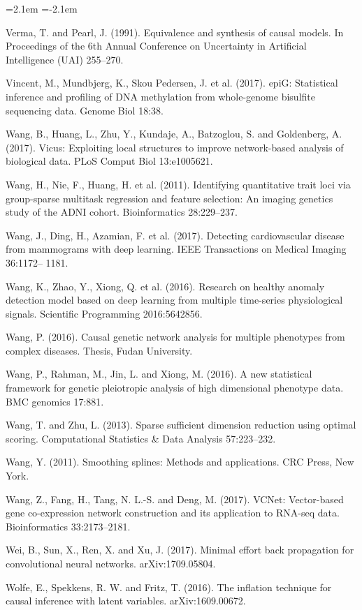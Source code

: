 \begin{list}{}{\leftmargin=2.1em  
  \itemindent=-2.1em \parsep=0pt \itemsep=2pt \topsep=0pt}
\item Verma, T. and Pearl, J. (1991). Equivalence and synthesis of causal models. In Proceedings of the 6th Annual Conference on Uncertainty in Artificial Intelligence (UAI) 255--270.
\item Vincent, M., Mundbjerg, K., Skou Pedersen, J. et al. (2017). epiG: Statistical inference and profiling of DNA methylation from whole-genome bisulfite sequencing data. Genome Biol 18:38.
\item Wang, B., Huang, L., Zhu, Y., Kundaje, A., Batzoglou, S. and Goldenberg, A. (2017). Vicus: Exploiting local structures to improve network-based analysis of biological data. PLoS Comput Biol 13:e1005621.
\item Wang, H., Nie, F., Huang, H. et al. (2011). Identifying quantitative trait loci via group-sparse multitask regression and feature selection: An imaging genetics study of the ADNI cohort. Bioinformatics 28:229--237.
\item Wang, J., Ding, H., Azamian, F. et al. (2017). Detecting cardiovascular disease from mammograms with deep learning. IEEE Transactions on Medical Imaging 36:1172-- 1181.
\item Wang, K., Zhao, Y., Xiong, Q. et al. (2016). Research on healthy anomaly detection model based on deep learning from multiple time-series physiological signals. Scientific Programming 2016:5642856.
\item Wang, P. (2016). Causal genetic network analysis for multiple phenotypes from complex diseases. Thesis, Fudan University.
\item Wang, P., Rahman, M., Jin, L. and Xiong, M. (2016). A new statistical framework for genetic pleiotropic analysis of high dimensional phenotype data. BMC genomics 17:881.
\item Wang, T. and Zhu, L. (2013). Sparse sufficient dimension reduction using optimal scoring. Computational Statistics \& Data Analysis 57:223--232.
\item Wang, Y. (2011). Smoothing splines: Methods and applications. CRC Press, New York.
\item Wang, Z., Fang, H., Tang, N. L.-S. and Deng, M. (2017). VCNet: Vector-based gene co-expression network construction and its application to RNA-seq data. Bioinformatics 33:2173--2181.
\item Wei, B., Sun, X., Ren, X. and Xu, J. (2017). Minimal effort back propagation for convolutional neural networks. arXiv:1709.05804.
\item Wolfe, E., Spekkens, R. W. and Fritz, T. (2016). The inflation technique for causal inference with latent variables. arXiv:1609.00672.

\end{list}
